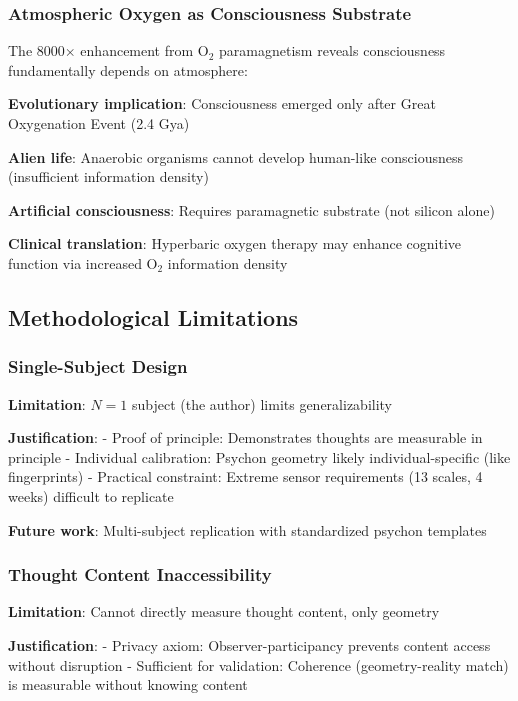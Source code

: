 \documentclass[11pt,onecolumn]{article}
\begin{document}
\subsubsection{Atmospheric Oxygen as Consciousness Substrate}

The 8000$\times$ enhancement from O$_2$ paramagnetism reveals consciousness fundamentally depends on atmosphere:

\textbf{Evolutionary implication}: Consciousness emerged only after Great Oxygenation Event (2.4 Gya)

\textbf{Alien life}: Anaerobic organisms cannot develop human-like consciousness (insufficient information density)

\textbf{Artificial consciousness}: Requires paramagnetic substrate (not silicon alone)

\textbf{Clinical translation}: Hyperbaric oxygen therapy may enhance cognitive function via increased O$_2$ information density

\subsection{Methodological Limitations}

\subsubsection{Single-Subject Design}

\textbf{Limitation}: $N = 1$ subject (the author) limits generalizability

\textbf{Justification}:
- Proof of principle: Demonstrates thoughts are measurable in principle
- Individual calibration: Psychon geometry likely individual-specific (like fingerprints)
- Practical constraint: Extreme sensor requirements (13 scales, 4 weeks) difficult to replicate

\textbf{Future work}: Multi-subject replication with standardized psychon templates

\subsubsection{Thought Content Inaccessibility}

\textbf{Limitation}: Cannot directly measure thought content, only geometry

\textbf{Justification}:
- Privacy axiom: Observer-participancy prevents content access without disruption
- Sufficient for validation: Coherence (geometry-reality match) is measurable without knowing content
\end{document}
